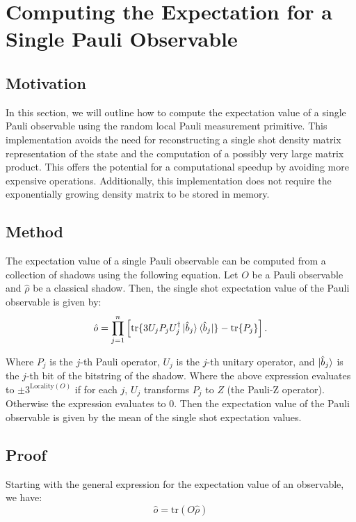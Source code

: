 \documentclass[12pt]{article}
\begin{document}
    \section{Computing the Expectation for a Single Pauli Observable} \label{sec:expectation}
    \subsection{Motivation}
    In this section, we will outline how to compute the expectation value of a single Pauli observable using the random local Pauli measurement primitive. This implementation avoids the need for reconstructing a single shot density matrix representation of the state and the computation of a possibly very large matrix product. This offers the potential for a computational speedup by avoiding more expensive operations. Additionally, this implementation does not require the exponentially growing density matrix to be stored in memory.

    \subsection{Method}
    The expectation value of a single Pauli observable can be computed from a collection of shadows using the following equation. Let $O$ be a Pauli observable and $\hat{\rho}$ be a classical shadow. Then, the single shot expectation value of the Pauli observable is given by:
    \begin{equation}
        \hat{o} = \prod_{j=1}^n \left[ \text{tr}\{ 3 U_jP_j U^\dagger_j \ket{\hat{b}_j}\bra{\hat{b}_j}\} - \text{tr}\{ P_j \} \right].
    \end{equation}

    Where $P_j$ is the $j$-th Pauli operator, $U_j$ is the $j$-th unitary operator, and $\ket{\hat{b}_j}$ is the $j$-th bit of the bitstring of the shadow. Where the above expression evaluates to $\pm3^{\text{Locality}(O)}$ if for each $j$, $U_j$ transforms $P_j$ to $Z$ (the Pauli-Z operator). Otherwise the expression evaluates to 0. Then the expectation value of the Pauli observable is given by the mean of the single shot expectation values.
    
    \subsection{Proof}
    Starting with the general expression for the expectation value of an observable, we have:
    \begin{equation*}
        \hat{o} = \text{tr}(O\hat{\rho})
    \end{equation*}
    
\end{document}
